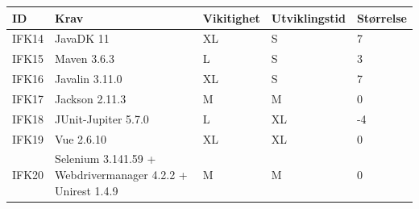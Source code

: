 \documentclass[12pt]{article}
\newcommand{\cellr}{\cellcolor{red!25}}
\newcommand{\celly}{\cellcolor{yellow!25}}
\newcommand{\cellg}{\cellcolor{green!25}}
\begin{document}
        \begin{tabular}{|p{2cm}|p{6cm}|
            >{\centering\arraybackslash}p{2cm}|
            >{\centering\arraybackslash}p{2cm}|
            >{\centering\arraybackslash}p{2cm}|}
            \hline
            \bf ID & \bf Krav & \bf Vikitighet & \bf Utviklingstid & \bf Størrelse\\
            \hline
            IFK14
            &
            JavaDK 11
            & XL & S & \cellg 7\\
            \hline
            IFK15
            &
            Maven 3.6.3
            & L & S & \cellg 3\\
            \hline
            IFK16
            &
            Javalin 3.11.0
            & XL & S & \cellg 7\\
            \hline
            IFK17
            &
            Jackson 2.11.3
            & M & M & \celly 0\\
            \hline
            IFK18
            &
            JUnit-Jupiter 5.7.0
            & L & XL & \cellr -4\\
            \hline
            IFK19
            &
            Vue 2.6.10
            & XL & XL & \celly 0\\
            \hline
            IFK20
            &
            Selenium 3.141.59 + Webdrivermanager 4.2.2 + Unirest 1.4.9
            & M & M & \celly 0\\
            \hline
        \end{tabular}
\end{document}
